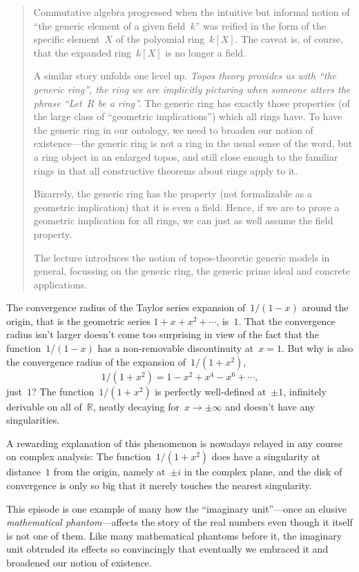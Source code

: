 \documentclass[10pt,reqno,a4paper,openany]{amsbook}
\theoremstyle{definition}
\theoremstyle{plain}
\theoremstyle{remark}
\newcommand{\RR}{\mathbb{R}}
\newcommand{\?}{\,{:}\,}
\renewcommand{\_}{\mathpunct{.}\,}
\newenvironment{intro}{\begin{quote}}{\end{quote}\bigskip}
\begin{document}
\begin{intro}
Commutative algebra progressed when the intuitive but informal notion of
``the generic element of a given field~$k$'' was reified in the form of the
specific element~$X$ of the polyomial ring~$k[X]$. The caveat is, of course,
that the expanded ring~$k[X]$ is no longer a field.

A similar story unfolds one level up. \emph{Topos theory provides us with ``the
generic ring'', the ring we are implicitly picturing when someone utters
the phrase ``Let~$R$ be a ring''.} The generic ring has exactly those
properties (of the large class of ``geometric implications'') which all rings
have. To have the generic ring in our ontology,
we need to broaden our notion of existence---the generic ring is not a
ring in the usual sense of the word, but a ring object in an enlarged
topos, and still close enough to the familiar rings in that all
constructive theorems about rings apply to it.

Bizarrely, the generic ring has the property (not formalizable as a
geometric implication) that it is even a field. Hence, if we are to
prove a geometric implication for all rings, we can just as well assume
the field property.

The lecture introduces the notion of topos-theoretic generic models in
general, focussing on the generic ring, the generic prime ideal and
concrete applications.
\end{intro}

The convergence radius of the Taylor series expansion of~$1/(1-x)$ around the
origin, that is the geometric series
$1 + x + x^2 + \cdots$,
is~$1$. That the convergence radius isn't larger doesn't come too surprising in
view of the fact that the function~$1/(1-x)$ has a non-removable discontinuity
at~$x = 1$. But why is also the convergence radius of the expansion
of~$1/(1+x^2)$,
\[ 1/(1+x^2) = 1 - x^2 + x^4 - x^6 + \cdots, \]
just~$1$? The function~$1/(1+x^2)$ is
perfectly well-defined at~$\pm 1$, infinitely derivable on all of~$\RR$, neatly
decaying for~$x \to \pm\infty$ and doesn't have any singularities.

A rewarding explanation of this phenomenon is nowadays relayed in any course on
complex analysis: The function~$1/(1+x^2)$ does have a singularity at
distance~$1$ from the origin, namely at~$\pm i$ in the complex plane, and the disk
of convergence is only so big that it merely touches the nearest singularity.

This episode is one example of many how the ``imaginary unit''---once
an elusive \emph{mathematical phantom}---affects the story of the real numbers even
though it itself is not one of them. Like many mathematical phantoms before it,
the imaginary unit obtruded its effects so convincingly that eventually we
embraced it and broadened our notion of existence.
\end{document}
